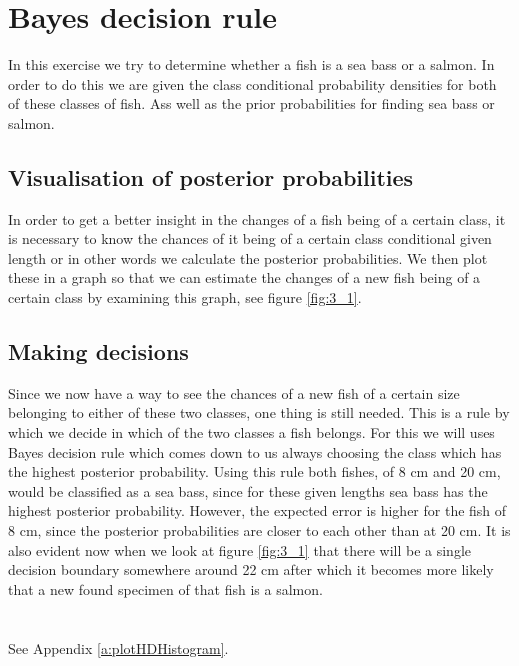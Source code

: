 \documentclass[10pt,a4paper]{article}
\begin{document}
\section{Bayes decision rule}
In this exercise we try to determine whether a fish is a sea bass or a salmon. In order to do this we are given the class conditional probability densities for both of these classes of fish. Ass well as the prior probabilities for finding sea bass or salmon.

\subsection{Visualisation of posterior probabilities}
In order to get a better insight in the changes of a fish being of a certain class, it is necessary to know the chances of it being of a certain class conditional given length or in other words we calculate the posterior probabilities. We then plot these in a graph so that we can estimate the changes of a new fish being of a certain class by examining this graph, see figure \ref{fig:3_1}.

\subsection{Making decisions}
Since we now have a way to see the chances of a new fish of a certain size belonging to either of these two classes, one thing is still needed. This is a rule by which we decide in which of the two classes a fish belongs. For this we will uses Bayes decision rule which comes down to us always choosing the class which has the highest posterior probability. Using this rule both fishes, of 8 cm and 20 cm, would be classified as a sea bass, since for these given lengths sea bass has the highest posterior probability. However, the expected error is higher for the fish of 8 cm, since the posterior probabilities are closer to each other than at 20 cm. It is also evident now when we look at figure \ref{fig:3_1} that there will be a single decision boundary somewhere around 22 cm after which it becomes more likely that a new found specimen of that fish is a salmon.

\section{}
\subsection{}
See Appendix \ref{a:plotHDHistogram}.
\end{document}
